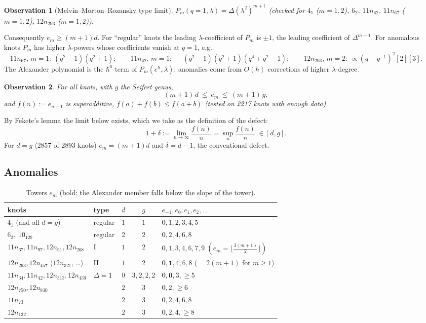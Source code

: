 \documentclass[11pt]{article}
\newtheorem{observation}{Observation}
\theoremstyle{definition}
\theoremstyle{remark}
\begin{document}
\begin{observation}[Melvin--Morton--Rozansky type limit]\label{obs:mmr}
$P_m(q=1,\lambda)=\Delta(\lambda^2)^{m+1}$
(checked for $4_1$ ($m=1,2$), $6_2$, $11n_{42}$, $11n_{67}$ ($m=1,2$), $12n_{293}$ ($m=1,2$)).
\end{observation}
Consequently $e_m\ge(m+1)d$.  For ``regular'' knots the leading $\lambda$-coefficient of $P_m$ is
$\pm1$, the leading coefficient of $\Delta^{m+1}$.  For anomalous knots $P_m$ has higher
$\lambda$-powers whose coefficients vanish at $q=1$, e.g.
\[
 11n_{67},\,m=1:\ (q^2-1)(q^2+1);\qquad
 11n_{42},\,m=1:\ -(q^2-1)(q^2+1)(q^4+q^2-1);\qquad
 12n_{293},\,m=2:\ \propto (q-q^{-1})^2[2][3].
\]
The Alexander polynomial is the $\hbar^0$ term of $P_m(e^\hbar,\lambda)$; anomalies come from
$O(\hbar)$ corrections of higher $\lambda$-degree.

\begin{observation}\label{obs:bounds}
For all knots, with $g$ the Seifert genus,
\[
  (m+1)\,d\ \le\ e_m\ \le\ (m+1)\,g ,
\]
and $f(n):=e_{n-1}$ is superadditive, $f(a)+f(b)\le f(a+b)$ (tested on 2217 knots with enough data).
\end{observation}
By Fekete's lemma the limit below exists, which we take as the definition of the defect:
\begin{equation}
  1+\delta:=\lim_{n\to\infty}\frac{f(n)}{n}=\sup_n\frac{f(n)}{n}\ \in[d,g].
\end{equation}
For $d=g$ (2857 of 2893 knots) $e_m=(m+1)d$ and $\delta=d-1$, the conventional defect.

\subsection{Anomalies}

\begin{table}[h]
\centering
\begin{tabular}{llcc l}
\toprule
knots & type & $d$ & $g$ & $e_{-1},e_0,e_1,e_2,\dots$\\
\midrule
$4_1$ (and all $d=g$) & regular & $1$ & $1$ & $0,1,2,3,4,5$\\
$6_2,\ 10_{129}$ & regular & $2$ & $2$ & $0,2,4,6,8$\\
$11n_{67},11n_{97},12n_{51},12n_{268}$ & I & $1$ & $2$ & $0,1,3,4,6,7,9$ \quad $(e_m=\lfloor\frac{3(m+1)}2\rfloor)$\\
$12n_{293},12n_{457}$ ($12n_{321}$, \dots) & II & $1$ & $2$ & $0,\mathbf 1,4,6,8$ \quad ($=2(m+1)$ for $m\ge1$)\\
$11n_{34},11n_{42},12n_{313},12n_{430}$ & $\Delta=1$ & $0$ & $3,2,2,2$ & $0,\mathbf 0,3,\ge5$\\
$12n_{750},12n_{830}$ & & $2$ & $3$ & $0,2,\ge6$\\
$11n_{73}$ & & $2$ & $3$ & $0,2,4,6,8$\\
$12n_{132}$ & & $2$ & $3$ & $0,2,4,\ge8$\\
\bottomrule
\end{tabular}
\caption{Towers $e_m$ (bold: the Alexander member falls below the slope of the tower).}
\end{table}
\end{document}
